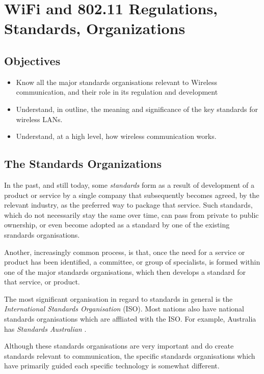 \chapter{WiFi and 802.11 Regulations, Standards, Organizations}\label{wifi}

\minitoc 


\section*{Objectives}
\begin{itemize}

\item Know all the major standards organisations relevant to Wireless communication, and
	their role in its regulation and development

\item Understand, in outline, the meaning and significance of the key standards
	for wireless LANs.

\item Understand, at a high level, how wireless communication works.

\end{itemize}

\section{The Standards Organizations}

In the past, and still today, some {\em standards} form as a result of
development of a product or service by a single company that subsequently
becomes agreed, by the relevant industry, as the preferred way to package
that service. Such standards, which do not necessarily stay the same
over time, can pass from private to public ownership, or even
become adopted as a standard by one of the existing srandards organisations.

Another, increasingly common process, is that, once the need for a service
or product has been identified, a committee, or group of specialists,
is formed within one of the major standards organisations, which then
develops a standard for that service, or product.

The most significant organisation in regard to standards in general
is the {\em International Standards Organisation} (ISO).
Most nations also have national standards organisations which are
affliated with the ISO. For example, Australia has {\em Standards Australian}
\cite{SA}. 

Although these standards organisations are very important and 
do create standards relevant to communication, the specific standards
organisations which have primarily guided each specific technology is
somewhat different.

